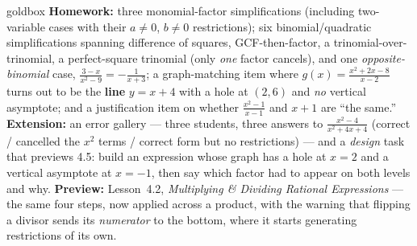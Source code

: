 \documentclass[10pt]{article}
\begin{document}
\begin{skillbox}{goldbox}
\textbf{Homework:} three monomial-factor simplifications (including two-variable cases with their
$a\neq0$, $b\neq0$ restrictions); six binomial/quadratic simplifications spanning difference of
squares, GCF-then-factor, a trinomial-over-trinomial, a perfect-square trinomial (only \emph{one}
factor cancels), and one \emph{opposite-binomial} case, $\frac{3-x}{x^2-9}=-\frac{1}{x+3}$; a
graph-matching item where $g(x)=\frac{x^2+2x-8}{x-2}$ turns out to be the \textbf{line} $y=x+4$ with a
hole at $(2,6)$ and \emph{no} vertical asymptote; and a justification item on whether
$\frac{x^2-1}{x-1}$ and $x+1$ are ``the same.'' \textbf{Extension:} an error gallery --- three students,
three answers to $\frac{x^2-4}{x^2+4x+4}$ (correct / cancelled the $x^2$ terms / correct form but no
restrictions) --- and a \emph{design} task that previews 4.5: build an expression whose graph has a hole
at $x=2$ and a vertical asymptote at $x=-1$, then say which factor had to appear on both levels and
why. \textbf{Preview:} Lesson~4.2, \emph{Multiplying \& Dividing Rational Expressions} --- the same four
steps, now applied across a product, with the warning that flipping a divisor sends its \emph{numerator}
to the bottom, where it starts generating restrictions of its own.
\end{skillbox}
\end{document}
